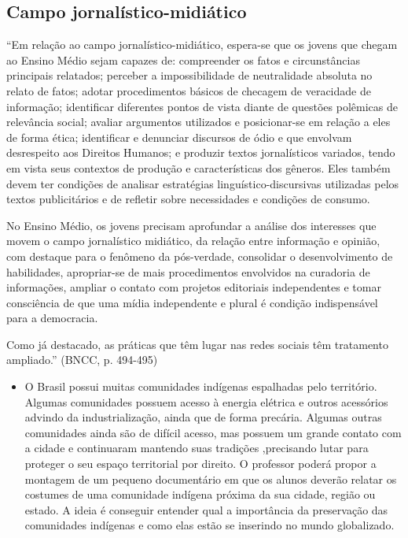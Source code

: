 \documentclass[12pt]{extarticle}
\begin{document}
\subsection{Campo jornalístico-midiático }

``Em relação ao campo jornalístico-midiático, espera-se que os jovens
que chegam ao Ensino Médio sejam capazes de: compreender os fatos e
circunstâncias principais relatados; perceber a impossibilidade de
neutralidade absoluta no relato de fatos; adotar procedimentos básicos
de checagem de veracidade de informação; identificar diferentes pontos
de vista diante de questões polêmicas de relevância social; avaliar
argumentos utilizados e posicionar-se em relação a eles de forma ética;
identificar e denunciar discursos de ódio e que envolvam desrespeito aos
Direitos Humanos; e produzir textos jornalísticos variados, tendo em
vista seus contextos de produção e características dos gêneros. Eles
também devem ter condições de analisar estratégias
linguístico-discursivas utilizadas pelos textos publicitários e de
refletir sobre necessidades e condições de consumo.

No Ensino Médio, os jovens precisam aprofundar a análise dos interesses
que movem o campo jornalístico midiático, da relação entre informação e
opinião, com destaque para o fenômeno da pós-verdade, consolidar o
desenvolvimento de habilidades, apropriar-se de mais procedimentos
envolvidos na curadoria de informações, ampliar o contato com projetos
editoriais independentes e tomar consciência de que uma mídia
independente e plural é condição indispensável para a democracia.

Como já destacado, as práticas que têm lugar nas redes sociais têm
tratamento ampliado.'' (BNCC, p. 494-495)

\begin{itemize}
\item
  O Brasil possui muitas comunidades indígenas espalhadas pelo
  território. Algumas comunidades possuem acesso à energia elétrica e
  outros acessórios advindo da industrialização, ainda que de forma
  precária. Algumas outras comunidades ainda são de difícil acesso, mas
  possuem um grande contato com a cidade e continuaram mantendo suas
  tradições ,precisando lutar para proteger o seu espaço territorial por
  direito. O professor poderá propor a montagem de um pequeno
  documentário em que os alunos deverão relatar os costumes de uma
  comunidade indígena próxima da sua cidade, região ou estado. A ideia é
  conseguir entender qual a importância da preservação das comunidades
  indígenas e como elas estão se inserindo no mundo globalizado.
\end{itemize}
\end{document}
